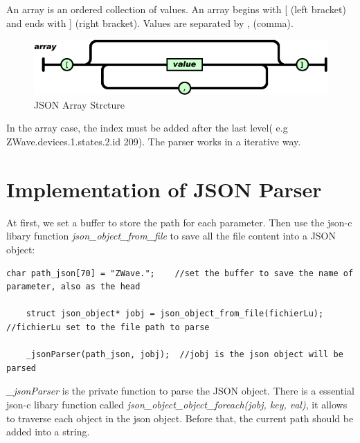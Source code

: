 An array is an ordered collection of values. An array begins with [ (left bracket) and ends with ] (right bracket). Values are separated by , (comma).
\begin{figure}[htbp]
	\centering
		\includegraphics[width=12cm]{Figures/jsonarray.png}
	\caption[JSON Array Strcture]{JSON Array Strcture}
\end{figure}

In the array case, the index must be added after the last level( e.g ZWave.devices.1.states.2.id 209). The parser works in a iterative way.

\section{Implementation of JSON Parser}

At first, we set a buffer to store the path for each parameter. Then use the json-c libary function \textit{json\_object\_from\_file} to save all the file content into a JSON object:

\begin{lstlisting}[mathescape]
    char path_json[70] = "ZWave.";    //set the buffer to save the name of parameter, also as the head

    struct json_object* jobj = json_object_from_file(fichierLu);  //fichierLu set to the file path to parse

    _jsonParser(path_json, jobj);  //jobj is the json object will be parsed
\end{lstlisting}


\textit{\_jsonParser} is the private function to parse the JSON object. There is a essential json-c libary function called \textit{json\_object\_object\_foreach(jobj, key, val)}, it allows to traverse each object in the json object. Before that, the current path should be added into a string.

